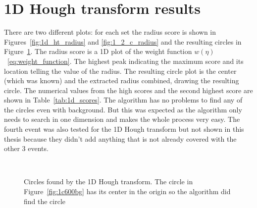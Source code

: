 \documentclass[11pt,twoside]{scrreprt}
\begin{document}
\section{1D Hough transform results} %
\label{sec:1d_hough_transform_results}

There are two different plots: for each set the radius score is shown in Figures~\ref{fig:1d_ht_radius} and \ref{fig:1_2_c_radius} and the resulting
circles in Figure~\ref{fig:1d_ht_results}. The radius score is a 1D plot of the weight function 
$w(\eta)$~\ref{eq:weight_function}. The highest peak indicating the maximum score and its location telling the value of the radius.
The resulting circle plot is the center (which was known) and the extracted radius combined, drawing the resulting circle. 
The numerical values from the high scores and the second highest score are shown in Table~\ref{tab:1d_scores}. 
The algorithm has no problems to find any of  the circles even with background. But this was expected as the 
algorithm only needs to search in one dimension and makes the whole process very easy. The fourth event was also tested for the 1D Hough
transform but not shown in this thesis because they didn't add anything that is not already covered with the other 3 events.

\begin{figure}[htp]
        \centering
        ~ %
                \label{fig:2c0bg}
        ~ %
                \label{fig:5c30bg}
        \caption{Circles found by the 1D Hough transform. The circle in Figure~\ref{fig:1c600bg} has its center in the origin so the algorithm did find the circle}\label{fig:1d_ht_results}
\end{figure}
\end{document}

